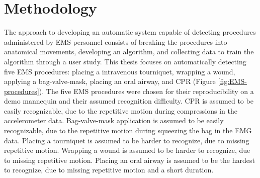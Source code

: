 
\chapter{Methodology}
\label{ch:Methodology}
The approach to developing an automatic system capable of detecting procedures administered by EMS personnel consists of breaking the procedures into anatomical movements, developing an algorithm, and collecting data to train the algorithm through a user study. This thesis focuses on automatically detecting five EMS procedures: placing a intravenous tourniquet, wrapping a wound, applying a bag-valve-mask, placing an oral airway, and \gls{CPR} (Figure \ref{fig:EMS-procedures}). The five EMS procedures were chosen for their reproducibility on a demo mannequin and their assumed recognition difficulty. CPR is assumed to be easily recognizable, due to the repetitive motion during compressions in the accelerometer data. Bag-valve-mask application is assumed to be easily recognizable, due to the repetitive motion during squeezing the bag in the EMG data. Placing a tourniquet is assumed to be harder to recognize, due to missing repetitive motion. Wrapping a wound is assumed to be harder to recognize, due to missing repetitive motion. Placing an oral airway is assumed to be the hardest to recognize, due to missing repetitive motion and a short duration. 

